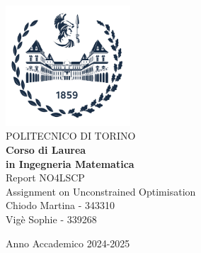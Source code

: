 \begin{titlepage}
    
    \begin{center}
    \includegraphics[width=0.35\textwidth]{img/logo_polito_2021.jpg}\\[1cm] 
    {\huge POLITECNICO DI TORINO}\\[1.5cm]
    \textbf{Corso di Laurea\\in Ingegneria Matematica}\\[3cm]
    
     
    {\huge Report NO4LSCP}\\[1cm]
    {\huge Assignment on Unconstrained Optimisation}\\[1cm]
    {\large Chiodo Martina - 343310 \\
    Vigè Sophie - 339268}
    
    
    
    \vfill
    
    Anno Accademico 2024-2025
    \end{center}
    
    \restoregeometry
    
    \end{titlepage}